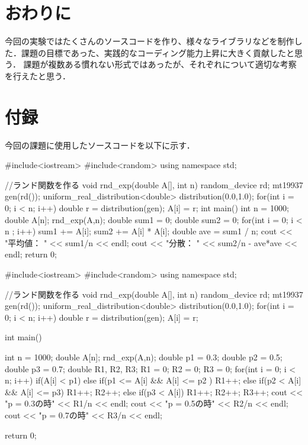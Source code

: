 \documentclass[fleqn, a4paper. 12pt]{ltjsarticle} %
\begin{document}
\section*{おわりに}
今回の実験ではたくさんのソースコードを作り、様々なライブラリなどを制作した．課題の目標であった、実践的なコーディング能力上昇に大きく貢献したと思う．
課題が複数ある慣れない形式ではあったが、それぞれについて適切な考察を行えたと思う．
\newpage

 

\newpage
\section*{付録}
今回の課題に使用したソースコードを以下に示す．
\begin{cppcode}
  #include<iostream>
#include<random>
using namespace std;

//ランド関数を作る
void rnd_exp(double A[], int n){
    random_device rd;
    mt19937 gen(rd());
    uniform_real_distribution<double> distribution(0.0,1.0);
    for(int i = 0; i < n; i++){
        double r = distribution(gen);
        A[i] = r;
    }
}
int main(){
    int n = 1000;
    double A[n];
    rnd_exp(A,n);
    double sum1 = 0;
    double sum2 = 0;
    for(int i = 0; i < n ; i++){
        sum1 += A[i];
        sum2 += A[i] * A[i];
    }
    double ave = sum1 / n;
    cout << "平均値： " << sum1/n << endl;
    cout << "分散： " << sum2/n - ave*ave << endl;
    return 0;
}
\end{cppcode}
\begin{cppcode}
  #include<iostream>
#include<random>
using namespace std;

//ランド関数を作る
void rnd_exp(double A[], int n){
    random_device rd;
    mt19937 gen(rd());
    uniform_real_distribution<double> distribution(0.0,1.0);
    for(int i = 0; i < n; i++){
        double r = distribution(gen);
        A[i] = r;
    }
}

int main(){
    int n = 1000;
    double A[n];
    rnd_exp(A,n);
    double p1 = 0.3;
    double p2 = 0.5;
    double p3 = 0.7;
    double R1, R2, R3;
    R1 = 0;
    R2 = 0;
    R3 = 0;
    for(int i = 0; i < n; i++){
        if(A[i] < p1){
        }
        else if(p1 <= A[i] && A[i] <= p2 ){
            R1++;
        }
        else if(p2 < A[i] && A[i] <= p3){
            R1++;
            R2++;
        }
        else if(p3 < A[i]){
            R1++;
            R2++;
            R3++;
        }
    }
    cout << "p = 0.3の時" << R1/n << endl;
    cout << "p = 0.5の時" << R2/n << endl;
    cout << "p = 0.7の時" << R3/n << endl;

    return 0;
}
\end{cppcode}
\end{document}
